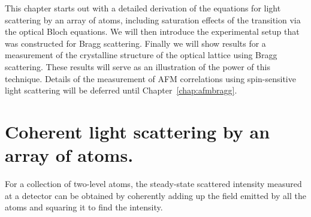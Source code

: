 This chapter starts out with a detailed derivation of the equations for light
scattering by an array of atoms, including saturation effects of the transition
via the optical Bloch equations.   We will then introduce the experimental
setup that was constructed for Bragg scattering.   Finally we will show results
for a measurement of the crystalline structure of the optical lattice using
Bragg scattering.  These results will serve as an illustration of the power of
this technique.   Details of the measurement of AFM correlations using
spin-sensitive light scattering will be deferred until
Chapter~\ref{chap:afmbragg}.  
 
\section{Coherent light scattering by an array of atoms. } 

For a collection of two-level atoms, the steady-state scattered intensity
measured at a detector can be obtained by coherently adding up the field
emitted by all the atoms and squaring it to find the intensity.



